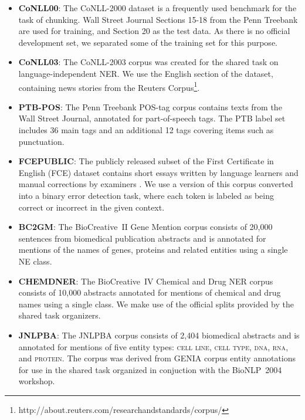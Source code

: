 \documentclass[11pt]{article}
\begin{document}
\begin{itemize}
\item \textbf{CoNLL00}: The CoNLL-2000 dataset \cite{TjongKimSang2000} is a frequently used benchmark for the task of chunking. Wall Street Journal Sections 15-18 from the Penn Treebank are used for training, and Section 20 as the test data. As there is no official development set, we separated some of the training set for this purpose.

\item \textbf{CoNLL03}: The CoNLL-2003 corpus \cite{TjongKimSang2003} was created for the shared task on language-independent NER. 
We use the English section of the dataset, containing news stories from the Reuters Corpus\footnote{http://about.reuters.com/researchandstandards/corpus/}.


\item \textbf{PTB-POS}: The Penn Treebank POS-tag corpus \cite{Marcus1993b} contains texts from the Wall Street Journal, annotated for part-of-speech tags. The PTB label set includes 36 main tags and an additional 12 tags covering items such as punctuation.

\item \textbf{FCEPUBLIC}:
The publicly released subset of the First Certificate in English (FCE) dataset contains short essays written by language learners and manual corrections by examiners \cite{Yannakoudakis2011}. We use a version of this corpus converted into a binary error detection task, where each token is labeled as being correct or incorrect in the given context. 


\item \textbf{BC2GM}:
The BioCreative~II Gene Mention corpus \cite{Smith2008} consists of 20,000
sentences from biomedical publication abstracts and is annotated for
mentions of the names of genes, proteins and related entities
using a single NE class.


\item \textbf{CHEMDNER}:
The BioCreative~IV Chemical and Drug \cite{Krallinger2015} NER corpus consists of 10,000 abstracts annotated for mentions of
chemical and drug names using a single class.
We make use of the official splits provided by the shared task organizers.

\item \textbf{JNLPBA}:
The JNLPBA corpus \cite{Kim2004} consists of 2,404 biomedical abstracts and is annotated for mentions of five entity types:
\textsc{cell line}, \textsc{cell type}, \textsc{dna}, \textsc{rna},
and \textsc{protein}.
The corpus was derived from GENIA corpus entity annotations for use in
the shared task organized in conjuction with the BioNLP~2004 workshop.



\end{itemize}
\end{document}

